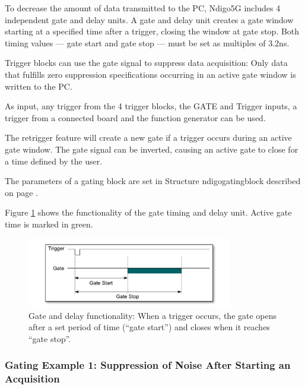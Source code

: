         To decrease the amount of data transmitted to the PC, Ndigo5G includes 4 independent gate and delay units. A gate and delay unit creates a gate window starting at a specified time after a trigger, closing the window at gate stop. Both timing values — gate start and gate stop — must be set as multiples of 3.2ns.\par

        Trigger blocks can use the gate signal to suppress data acquisition: Only data that fulfills zero suppression specifications occurring in an active gate window is written to the PC.\par
        As input, any trigger from the 4 trigger blocks, the GATE and Trigger inputs, a trigger from a connected board and the function generator can be used.\par
        
        The retrigger feature will create a new gate if a trigger occurs during an active gate window. The gate signal can be inverted, causing an active gate to close for a time defined by the user.\par
        
        The parameters of a gating block are set in Structure \textsf{ndigo\tu gating\tu block} described on page \pageref{cp:gatingblock}.\par
        
        Figure \ref{fig:GateUDelay} shows the functionality of the gate timing and delay unit. Active gate time is marked in green.
        
        \begin{figure}[ht]
            \begin{center}
                \includegraphics[width=0.8\textwidth]{figures/GateUDelay.pdf}
                \caption{\label{fig:GateUDelay} Gate and delay functionality: When a trigger occurs, the gate opens after a set period of time (``gate start'') and closes when it reaches ``gate stop''.}
            \end{center}
        \end{figure}
        
        \subsubsection{Gating Example 1: Suppression of Noise After Starting an Acquisition}
            
